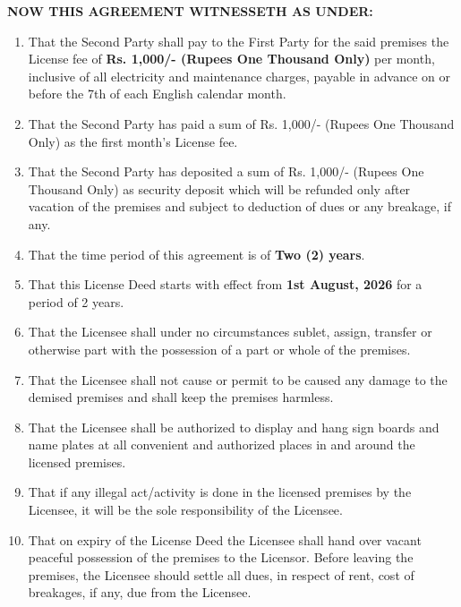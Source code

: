 \documentclass[a4paper,12pt]{article}
\begin{document}
\begin{center}
\textbf{NOW THIS AGREEMENT WITNESSETH AS UNDER:}
\end{center}

\vspace{0.3cm}

\begin{enumerate}[itemsep=4mm]

\item That the Second Party shall pay to the First Party for the said premises the License fee of \textbf{Rs. 1,000/- (Rupees One Thousand Only)} per month, inclusive of all electricity and maintenance charges, payable in advance on or before the 7th of each English calendar month.

\item That the Second Party has paid a sum of Rs. 1,000/- (Rupees One Thousand Only) as the first month's License fee.

\item That the Second Party has deposited a sum of Rs. 1,000/- (Rupees One Thousand Only) as security deposit which will be refunded only after vacation of the premises and subject to deduction of dues or any breakage, if any.

\item That the time period of this agreement is of \textbf{Two (2) years}.

\item That this License Deed starts with effect from \textbf{1st August, 2026} for a period of 2 years.

\item That the Licensee shall under no circumstances sublet, assign, transfer or otherwise part with the possession of a part or whole of the premises.

\item That the Licensee shall not cause or permit to be caused any damage to the demised premises and shall keep the premises harmless.

\item That the Licensee shall be authorized to display and hang sign boards and name plates at all convenient and authorized places in and around the licensed premises.

\item That if any illegal act/activity is done in the licensed premises by the Licensee, it will be the sole responsibility of the Licensee.

\item That on expiry of the License Deed the Licensee shall hand over vacant peaceful possession of the premises to the Licensor. Before leaving the premises, the Licensee should settle all dues, in respect of rent, cost of breakages, if any, due from the Licensee.


\end{enumerate}
\end{document}
